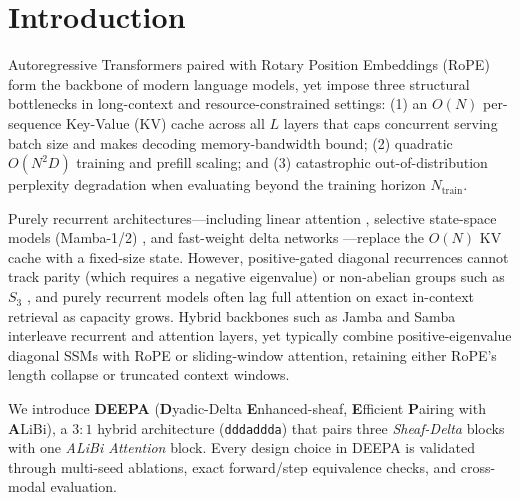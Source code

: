 \documentclass[10pt,a4paper]{article}
\begin{document}
\vspace{4pt}

\section{Introduction}

Autoregressive Transformers \cite{vaswani2017} paired with Rotary Position Embeddings (RoPE) \cite{su2024} form the backbone of modern language models, yet impose three structural bottlenecks in long-context and resource-constrained settings: (1) an $O(N)$ per-sequence Key-Value (KV) cache across all $L$ layers that caps concurrent serving batch size and makes decoding memory-bandwidth bound; (2) quadratic $O(N^2 D)$ training and prefill scaling; and (3) catastrophic out-of-distribution perplexity degradation when evaluating beyond the training horizon $N_{\text{train}}$.

Purely recurrent architectures---including linear attention \cite{katharopoulos2020}, selective state-space models (Mamba-1/2) \cite{gu2023,dao2024}, and fast-weight delta networks \cite{schlag2021,yang2024b,yang2024c}---replace the $O(N)$ KV cache with a fixed-size state. However, positive-gated diagonal recurrences cannot track parity (which requires a negative eigenvalue) or non-abelian groups such as $S_3$ \cite{merrill2024,grazzi2024}, and purely recurrent models often lag full attention on exact in-context retrieval as capacity grows. Hybrid backbones such as Jamba \cite{lieber2024} and Samba \cite{ren2024} interleave recurrent and attention layers, yet typically combine positive-eigenvalue diagonal SSMs with RoPE or sliding-window attention, retaining either RoPE's length collapse or truncated context windows.

We introduce \textbf{DEEPA} (\textbf{D}yadic-Delta \textbf{E}nhanced-sheaf, \textbf{E}fficient \textbf{P}airing with \textbf{A}LiBi), a $3:1$ hybrid architecture (\texttt{dddaddda}) that pairs three \emph{Sheaf-Delta} blocks with one \emph{ALiBi Attention} block. Every design choice in DEEPA is validated through multi-seed ablations, exact forward/step equivalence checks, and cross-modal evaluation.
\end{document}
